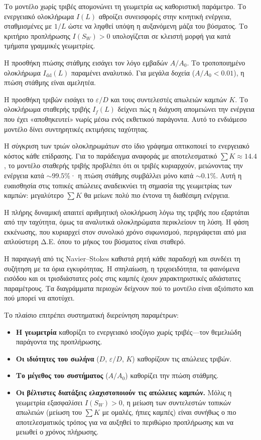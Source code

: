 \documentclass[11pt]{article}
\begin{document}
Το μοντέλο χωρίς τριβές απομονώνει τη γεωμετρία ως καθοριστική παράμετρο. Το ενεργειακό ολοκλήρωμα $I(L)$ αθροίζει συνεισφορές στην κινητική ενέργεια, σταθμισμένες με $1/L$ ώστε να ληφθεί υπόψη η αυξανόμενη μάζα του βύσματος. Το κριτήριο προπλήρωσης $I(S_W) > 0$ υπολογίζεται σε κλειστή μορφή για κατά τμήματα γραμμικές γεωμετρίες.

Η προσθήκη πτώσης στάθμης εισάγει τον λόγο εμβαδών $A/A_0$. Το τροποποιημένο ολοκλήρωμα $I_{\text{dd}}(L)$ παραμένει αναλυτικό. Για μεγάλα δοχεία ($A/A_0 < 0.01$), η πτώση στάθμης είναι αμελητέα.

Η προσθήκη τριβών εισάγει το $\varepsilon/D$ και τους συντελεστές απωλειών καμπών $K$. Το ολοκλήρωμα σταθερής τριβής $I_f(L)$ δείχνει πώς η διάχυση απομειώνει την ενέργεια που έχει «αποθηκευτεί» νωρίς μέσω ενός εκθετικού παράγοντα. Αυτό το ενδιάμεσο μοντέλο δίνει συντηρητικές εκτιμήσεις ταχύτητας.

Η σύγκριση των τριών ολοκληρωμάτων στο ίδιο γράφημα οπτικοποιεί το ενεργειακό κόστος κάθε επίδρασης. Για το παράδειγμα αναφοράς με αποτελεσματικό $\sum K \approx 14.4$, το μοντέλο σταθερής τριβής προβλέπει ότι οι τριβές κυριαρχούν, μειώνοντας την ενέργεια κατά $\sim 99.5\%$· η πτώση στάθμης συμβάλλει μόνο κατά $\sim 0.1\%$. Αυτή η ευαισθησία στις τοπικές απώλειες αναδεικνύει τη σημασία της γεωμετρίας των καμπών: μεγαλύτερο $\sum K$ θα μείωνε πολύ πιο έντονα τη διαθέσιμη ενέργεια.

Η πλήρης δυναμική απαιτεί αριθμητική ολοκλήρωση λόγω της τριβής που εξαρτάται από την ταχύτητα, όμως τα αναλυτικά ολοκληρώματα περικλείουν τη λύση. Η φάση εκκένωσης, που κυριαρχεί στον συνολικό χρόνο σιφωνισμού, περιγράφεται από μια απλούστερη Δ.Ε. όπου το μήκος του βύσματος είναι σταθερό.

Η παραγωγή από τις Navier--Stokes καθιστά ρητή κάθε παραδοχή και συνδέει τη συζήτηση με τα όρια εγκυρότητας. Η σπηλαίωση, η τριχοειδότητα, τα φαινόμενα εισόδου και οι τρισδιάστατες ροές στις καμπές έχουν χαρακτηριστικές αδιάστατες παραμέτρους. Τα διαγράμματα περιοχών δείχνουν πού το μοντέλο είναι αξιόπιστο και πού μπορεί να αποτύχει.

Το πλαίσιο επιτρέπει συστηματική διερεύνηση παραμέτρων:
\begin{itemize}[nosep,leftmargin=2em]
  \item \textbf{Η γεωμετρία} καθορίζει το ενεργειακό ισοζύγιο χωρίς τριβές---τον θεμελιώδη παράγοντα της προπλήρωσης.
  \item \textbf{Οι ιδιότητες του σωλήνα} ($D$, $\varepsilon/D$, $K$) καθορίζουν τις απώλειες τριβών.
  \item \textbf{Το μέγεθος του συστήματος} ($A/A_0$) καθορίζει την πτώση στάθμης.
  \item \textbf{Οι βέλτιστες διατάξεις ελαχιστοποιούν τις απώλειες καμπών.} Μόλις η γεωμετρία εξασφαλίσει $I(S_W) > 0$, η μείωση των συντελεστών τοπικών απωλειών (μείωση του $\sum K$ με ομαλές, ήπιες καμπές) είναι συνήθως ο πιο αποτελεσματικός τρόπος για να αυξηθεί το περιθώριο προπλήρωσης και να μειωθεί ο χρόνος πλήρωσης.
\end{itemize}
\end{document}
